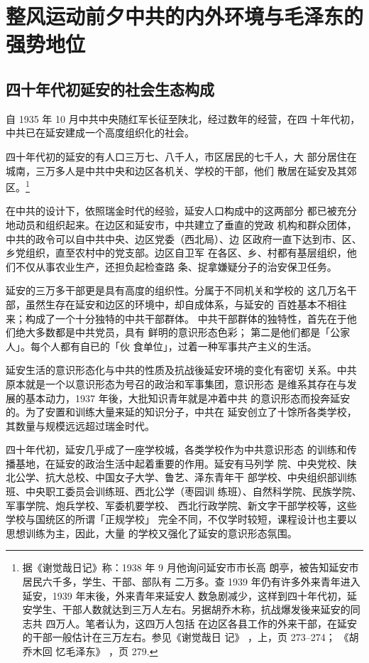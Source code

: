 \chapter{整风运动前夕中共的内外环境与毛泽东的强势地位}
\section{四十年代初延安的社会生态构成}
自 1935 年 10 月中共中央随红军长征至陕北，经过数年的经营，在四
十年代初，中共已在延安建成一个高度组织化的社会。

四十年代初的延安的有人口三万七、八千人，市区居民的七千人，大
部分居住在城南，三万多人是中共中央和边区各机关、学校的干部，他们
散居在延安及其郊区。\footnote{据《谢觉哉日记》称：1938 年 9 月他询问延安市市长高
朗亭，被告知延安市居民六千多，学生、干部、部队有
二万多。查 1939 年仍有许多外来青年进入延安，1939 年末後，外来青年来延安人
数急剧减少，这样到四十年代初，延
安学生、干部人数就达到三万人左右。另据胡乔木称，抗战爆发後来延安的同志共
四万人。笔者认为，这四万人包括
在边区各县工作的外来干部，在延安的干部一般估计在三万左右。参见《谢觉哉日
记》
，上，页 273--274；
《胡乔木回
忆毛泽东》
，页 279. }


在中共的设计下，依照瑞金时代的经验，延安人口构成中的这两部分
都已被充分地动员和组织起来。在边区和延安市，中共建立了垂直的党政
机构和群众团体，中共的政令可以自中共中央、边区党委（西北局）、边
区政府一直下达到市、区、乡党组织，直至农村中的党支部。边区自卫军
在各区、乡、村都有基层组织，他们不仅从事农业生产，还担负起检查路
条、捉拿嫌疑分子的治安保卫任务。

延安的三万多干部更是具有高度的组织性。分属于不同机关和学校的
这几万名干部，虽然生存在延安和边区的环境中，却自成体系，与延安的
百姓基本不相往来；构成了一个十分独特的中共干部群体。
中共干部群体的独特性，首先在于他们绝大多数都是中共党员，具有
鲜明的意识形态色彩；
第二是他们都是「公家人」。每个人都有自已的「伙
食单位」，过着一种军事共产主义的生活。

延安生活的意识形态化与中共的性质及抗战後延安环境的变化有密切
关系。中共原本就是一个以意识形态为号召的政治和军事集团，意识形态
是维系其存在与发展的基本动力，1937 年後，大批知识青年就是冲着中共
的意识形态而投奔延安的。为了安置和训练大量来延的知识分子，中共在
延安创立了十馀所各类学校，其数量与规模远远超过瑞金时代。

四十年代初，延安几乎成了一座学校城，各类学校作为中共意识形态
的训练和传播基地，在延安的政治生活中起着重要的作用。延安有马列学
院、中央党校、陕北公学、抗大总校、中国女子大学、鲁艺、泽东青年干
部学校、中央组织部训练班、中央职工委员会训练班、西北公学（枣园训
练班）、自然科学院、民族学院、军事学院、炮兵学校、军委机要学校、
西北行政学院、新文字干部学校等，这些学校与国统区的所谓「正规学校」
完全不同，不仅学时较短，课程设计也主要以思想训练为主，因此，大量
的学校又强化了延安的意识形态氛围。

